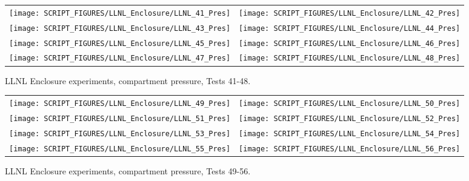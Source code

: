 \begin{figure}[p]
\begin{tabular*}{\textwidth}{l@{\extracolsep{\fill}}r}
\texttt{[image: SCRIPT\_FIGURES/LLNL\_Enclosure/LLNL\_41\_Pres]} &
\texttt{[image: SCRIPT\_FIGURES/LLNL\_Enclosure/LLNL\_42\_Pres]} \\
\texttt{[image: SCRIPT\_FIGURES/LLNL\_Enclosure/LLNL\_43\_Pres]} &
\texttt{[image: SCRIPT\_FIGURES/LLNL\_Enclosure/LLNL\_44\_Pres]} \\
\texttt{[image: SCRIPT\_FIGURES/LLNL\_Enclosure/LLNL\_45\_Pres]} &
\texttt{[image: SCRIPT\_FIGURES/LLNL\_Enclosure/LLNL\_46\_Pres]} \\
\texttt{[image: SCRIPT\_FIGURES/LLNL\_Enclosure/LLNL\_47\_Pres]} &
\texttt{[image: SCRIPT\_FIGURES/LLNL\_Enclosure/LLNL\_48\_Pres]}
\end{tabular*}
\caption{LLNL Enclosure experiments, compartment pressure, Tests 41-48.}
\label{LLNL_Enclosure_Pres_6}
\end{figure}

\begin{figure}[p]
\begin{tabular*}{\textwidth}{l@{\extracolsep{\fill}}r}
\texttt{[image: SCRIPT\_FIGURES/LLNL\_Enclosure/LLNL\_49\_Pres]} &
\texttt{[image: SCRIPT\_FIGURES/LLNL\_Enclosure/LLNL\_50\_Pres]} \\
\texttt{[image: SCRIPT\_FIGURES/LLNL\_Enclosure/LLNL\_51\_Pres]} &
\texttt{[image: SCRIPT\_FIGURES/LLNL\_Enclosure/LLNL\_52\_Pres]} \\
\texttt{[image: SCRIPT\_FIGURES/LLNL\_Enclosure/LLNL\_53\_Pres]} &
\texttt{[image: SCRIPT\_FIGURES/LLNL\_Enclosure/LLNL\_54\_Pres]} \\
\texttt{[image: SCRIPT\_FIGURES/LLNL\_Enclosure/LLNL\_55\_Pres]} &
\texttt{[image: SCRIPT\_FIGURES/LLNL\_Enclosure/LLNL\_56\_Pres]}
\end{tabular*}
\caption{LLNL Enclosure experiments, compartment pressure, Tests 49-56.}
\label{LLNL_Enclosure_Pres_7}
\end{figure}

